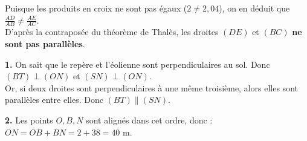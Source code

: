\documentclass[a4paper]{book}
\begin{document}
\begin{exercice}
    Puisque les produits en croix ne sont pas égaux ($2 \neq 2,04$), on en déduit que $\frac{AD}{AB} \neq \frac{AE}{AC}$.\\
    D'après la contraposée du théorème de Thalès, les droites $(DE)$ et $(BC)$ \textbf{ne sont pas parallèles}.
\end{exercice}


\begin{exercice}
    \begin{minipage}{0.5\textwidth}
        \begin{center}
        \end{center}
    \end{minipage}
    \hfill
    \begin{minipage}{0.45\textwidth}
        \textbf{1.} On sait que le repère et l'éolienne sont perpendiculaires au sol. Donc $(BT) \perp (ON)$ et $(SN) \perp (ON)$. \\
        Or, si deux droites sont perpendiculaires à une même troisième, alors elles sont parallèles entre elles. Donc $(BT) \parallel (SN)$.
        
        \vspace{0.3cm}
        \textbf{2.} Les points $O, B, N$ sont alignés dans cet ordre, donc : \\
        $ON = OB + BN = 2 + 38 = 40$ m.
    \end{minipage}


\end{exercice}
\end{document}
